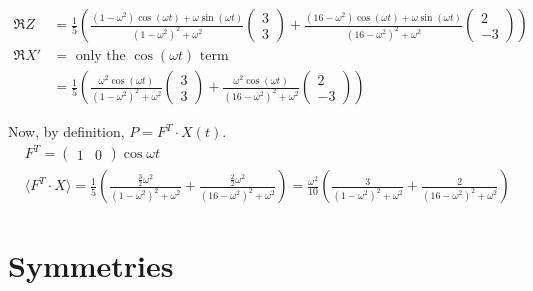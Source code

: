 \documentclass[twoside,10pt]{amsart}
\begin{document}
\[
\begin{aligned}
  \Re{Z} & = \frac{1}{5} \left( \frac{ (1- \omega^2 ) \cos{(\omega t) } + \omega \sin{(\omega t)} }{ (1-\omega^2 )^2 + \omega^2 } \left( \begin{matrix} 3 \\ 3 \end{matrix} \right) + \frac{ (16 - \omega^2) \cos{(\omega t) } + \omega \sin{ (\omega t) } }{ (16- \omega^2 )^2 + \omega^2 } \left( \begin{matrix} 2 \\ -3 \end{matrix} \right) \right) \\ 
  \Re{X'} & = \text{ only the $\cos{(\omega t)}$ term } \\ 
  & = \frac{1}{5} \left( \frac{ \omega^2 \cos{ ( \omega t) } }{ (1 -\omega^2 )^2 + \omega^2 } \left( \begin{matrix} 3 \\ 3 \end{matrix} \right) + \frac{ \omega^2 \cos{ (\omega t )} }{ (16- \omega^2)^2 + \omega^2 } \left( \begin{matrix} 2 \\ -3 \end{matrix} \right) \right)
\end{aligned}
\]

Now, by definition, $P = F^T \cdot X(t)$.  
\[
\begin{aligned}
  & F^T = (\begin{matrix} 1 & 0 \end{matrix} ) \cos{\omega t} \\ 
  & \langle F^T \cdot X \rangle = \frac{1}{5} \left( \frac{ \frac{3}{2} \omega^2 }{ (1-\omega^2)^2 + \omega^2 } + \frac{ \frac{2}{2} \omega^2 }{ (16 - \omega^2 )^2 + \omega^2 } \right) = \frac{ \omega^2 }{ 10 } \left( \frac{ 3}{ (1-\omega^2)^2 + \omega^2 } + \frac{ 2 }{ (16-\omega^2)^2 + \omega^2 } \right)
\end{aligned}
\]


\section{  Symmetries}
\end{document}
